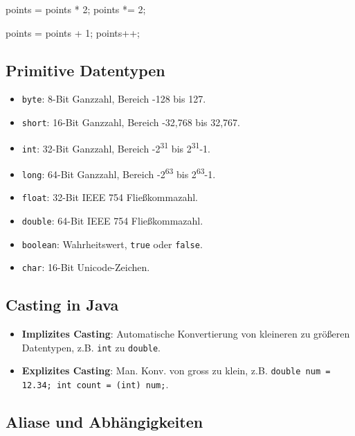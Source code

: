\documentclass[a4paper,10pt, dvipsnames]{report}
\newcommand{\javaInLine}[1]{\texttt{#1}}
\begin{document}
\begin{javacodebox}
points = points * 2;
points *= 2;

points = points + 1;
points++;
\end{javacodebox}



\subsection{Primitive Datentypen}

\begin{itemize}
    \item \javaInLine{byte}: 8-Bit Ganzzahl, Bereich -128 bis 127.
    \item \javaInLine{short}: 16-Bit Ganzzahl, Bereich -32,768 bis 32,767.
    \item \javaInLine{int}: 32-Bit Ganzzahl, Bereich -2\textsuperscript{31} bis 2\textsuperscript{31}-1.
    \item \javaInLine{long}: 64-Bit Ganzzahl, Bereich -2\textsuperscript{63} bis 2\textsuperscript{63}-1.
    \item \javaInLine{float}: 32-Bit IEEE 754 Fließkommazahl.
    \item \javaInLine{double}: 64-Bit IEEE 754 Fließkommazahl.
    \item \javaInLine{boolean}: Wahrheitswert, \javaInLine{true} oder \javaInLine{false}.
    \item \javaInLine{char}: 16-Bit Unicode-Zeichen.
\end{itemize}



\subsection{Casting in Java}

\begin{itemize}
    \item \textbf{Implizites Casting}: Automatische Konvertierung von kleineren zu größeren Datentypen, z.B. \javaInLine{int} zu \javaInLine{double}.
    \item \textbf{Explizites Casting}: Man. Konv. von gross zu klein, z.B. \javaInLine{double num = 12.34; int count = (int) num;}.
\end{itemize}



\subsection{Aliase und Abhängigkeiten}
\end{document}
